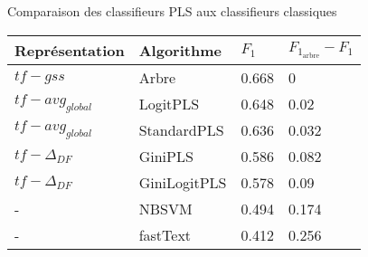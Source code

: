 \begin{frame}[t]{\mysubsectiontitle}
	Comparaison des classifieurs PLS aux classifieurs classiques

	\scriptsize
	\centering
	\begin{tabular}{|l|l|l|l|}
		\hline
		{Représentation} & {Algorithme} & {$F_{1}$} & $F_{1_\text{arbre}} - F_1$  \\ \hline
		
		$tf-gss$ & Arbre & 0.668 & 0\\ \hline
		$tf - avg_{global}$ & LogitPLS & 0.648 & 0.02   \\ \hline
		$tf - avg_{global}$ & StandardPLS & 0.636 & 0.032  \\ \hline
		$tf - \Delta_{DF}$ & GiniPLS & 0.586 & 0.082  \\ \hline
		$tf - \Delta_{DF}$ & GiniLogitPLS & 0.578 & 0.09  \\ \hline
		- & NBSVM & 0.494 & 0.174   \\ \hline
		- & fastText & 0.412 & 0.256  \\ \hline
	\end{tabular}	

\end{frame}


